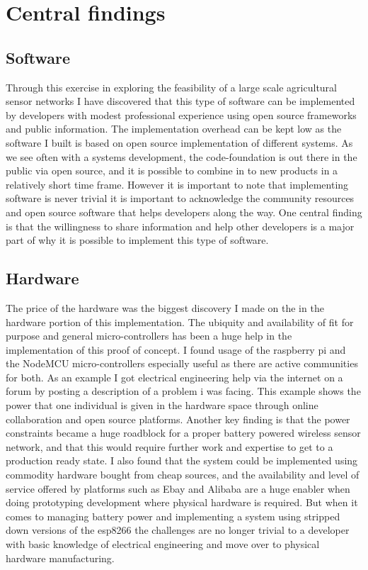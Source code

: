 \documentclass[]{uiophd}
\begin{document}
\section{Central findings}
\subsection{Software}
Through this exercise in exploring the feasibility of a large scale agricultural sensor networks I have discovered that this type of software can be implemented by developers with modest professional experience using open source frameworks and public information. The implementation overhead can be kept low as the software I built is based on open source implementation of different systems. As we see often with a systems development, the code-foundation is out there in the public via open source, and it is possible to combine in to new products in a relatively short time frame. However it is important to note that implementing software is never trivial it is important to acknowledge the community resources and open source software that helps developers along the way. One central finding is that the willingness to share information and help other developers is a major part of why it is possible to implement this type of software.

\subsection{Hardware}
The price of the hardware was the biggest discovery I made on the in the hardware portion of this implementation. The ubiquity and availability of fit for purpose and general micro-controllers has been a huge help in the implementation of this proof of concept. I found usage of the raspberry pi and the NodeMCU micro-controllers especially useful as there are active communities for both. As an example I got electrical engineering help via the internet on a forum by posting a description of a problem i was facing. This example shows the power that one individual is given in the hardware space through online collaboration and open source platforms.  Another key finding is that the power constraints became a huge roadblock for a proper battery powered wireless sensor network, and that this would require further work and expertise to get to a production ready state. I also found that the system could be implemented using commodity hardware bought from cheap sources, and the availability and level of service offered by platforms such as Ebay and Alibaba are a huge enabler when doing prototyping development where physical hardware is required. But when it comes to managing battery power and implementing a system using stripped down versions of the esp8266\parencite{espressif} the challenges are no longer trivial to a developer with basic knowledge of electrical engineering and move over to physical hardware manufacturing.
\end{document}
